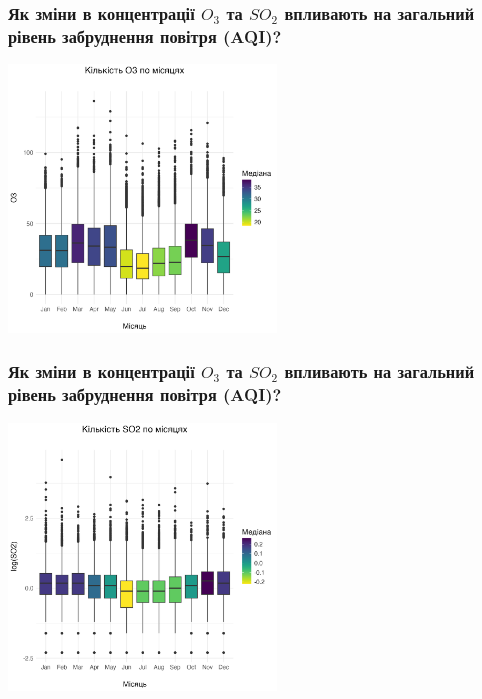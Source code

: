 \documentclass{beamer}
\begin{document}
\begin{frame}
  \frametitle{Як зміни в концентрації $O_3$ та $SO_2$ впливають на загальний рівень забруднення повітря (AQI)?}

  \begin{center}
    \includegraphics[height=2.8in]{plots/question2/seasonal_o3.png}
  \end{center}
\end{frame}

\begin{frame}
  \frametitle{Як зміни в концентрації $O_3$ та $SO_2$ впливають на загальний рівень забруднення повітря (AQI)?}

  \begin{center}
    \includegraphics[height=2.8in]{plots/question2/seasonal_so2.png}
  \end{center}
\end{frame}
\end{document}
